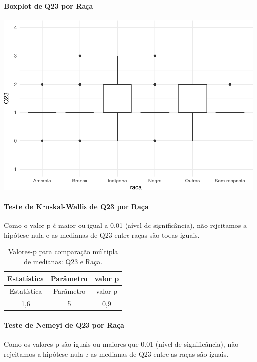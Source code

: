 \documentclass[]{article}
\let\oldparagraph\paragraph
\renewcommand{\paragraph}[1]{\oldparagraph{#1}\mbox{}}
\begin{document}
\hypertarget{boxplot-de-q23-por-rauxe7a}{%
\paragraph{Boxplot de Q23 por Raça}\label{boxplot-de-q23-por-rauxe7a}}

\begin{center}\includegraphics[width=0.75\linewidth]{relatorio_covid19_files/figure-latex/unnamed-chunk-579-1} \end{center}

\hypertarget{teste-de-kruskal-wallis-de-q23-por-rauxe7a}{%
\paragraph{Teste de Kruskal-Wallis de Q23 por Raça}\label{teste-de-kruskal-wallis-de-q23-por-rauxe7a}}

Como o valor-p é maior ou igual a 0.01 (nível de significância), não rejeitamos a hipótese nula e as medianas de Q23 entre raças são todas iguais.

\begin{longtable}[]{@{}ccc@{}}
\caption{\label{tab:unnamed-chunk-581}Valores-p para comparação múltipla de medianas: Q23 e Raça.}\tabularnewline
\toprule
Estatística & Parâmetro & valor p\tabularnewline
\midrule
\endfirsthead
\toprule
Estatística & Parâmetro & valor p\tabularnewline
\midrule
\endhead
1,6 & 5 & 0,9\tabularnewline
\bottomrule
\end{longtable}

\hypertarget{teste-de-nemeyi-de-q23-por-rauxe7a}{%
\paragraph{Teste de Nemeyi de Q23 por Raça}\label{teste-de-nemeyi-de-q23-por-rauxe7a}}

Como os valores-p são iguais ou maiores que 0.01 (nível de significância), não rejeitamos a hipótese nula e as medianas de Q23 entre as raças são iguais.
\end{document}
